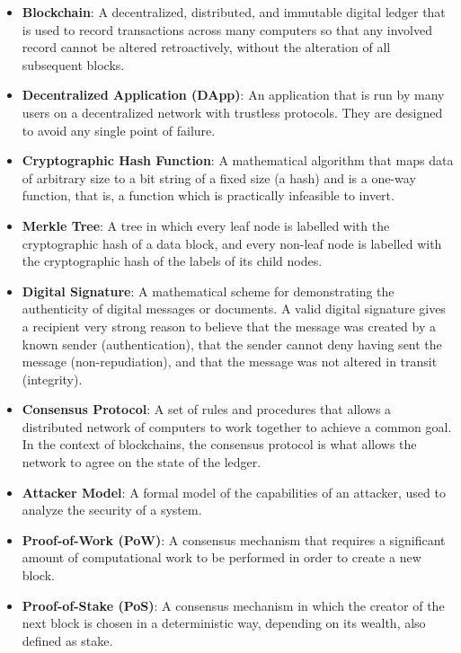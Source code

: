 \begin{itemize}
	\tightlist
	\item
	\textbf{Blockchain}: A decentralized, distributed, and immutable
	digital ledger that is used to record transactions across many
	computers so that any involved record cannot be altered retroactively,
	without the alteration of all subsequent blocks.
	\item
	\textbf{Decentralized Application (DApp)}: An application that is run
	by many users on a decentralized network with trustless protocols.
	They are designed to avoid any single point of failure.
	\item
	\textbf{Cryptographic Hash Function}: A mathematical algorithm that
	maps data of arbitrary size to a bit string of a fixed size (a hash)
	and is a one-way function, that is, a function which is practically
	infeasible to invert.
	\item
	\textbf{Merkle Tree}: A tree in which every leaf node is labelled with
	the cryptographic hash of a data block, and every non-leaf node is
	labelled with the cryptographic hash of the labels of its child nodes.
	\item
	\textbf{Digital Signature}: A mathematical scheme for demonstrating
	the authenticity of digital messages or documents. A valid digital
	signature gives a recipient very strong reason to believe that the
	message was created by a known sender (authentication), that the
	sender cannot deny having sent the message (non-repudiation), and that
	the message was not altered in transit (integrity).
	\item
	\textbf{Consensus Protocol}: A set of rules and procedures that allows
	a distributed network of computers to work together to achieve a
	common goal. In the context of blockchains, the consensus protocol is
	what allows the network to agree on the state of the ledger.
	\item
	\textbf{Attacker Model}: A formal model of the capabilities of an
	attacker, used to analyze the security of a system.
	\item
	\textbf{Proof-of-Work (PoW)}: A consensus mechanism that requires a
	significant amount of computational work to be performed in order to
	create a new block.
	\item
	\textbf{Proof-of-Stake (PoS)}: A consensus mechanism in which the
	creator of the next block is chosen in a deterministic way, depending
	on its wealth, also defined as stake.
\end{itemize}

